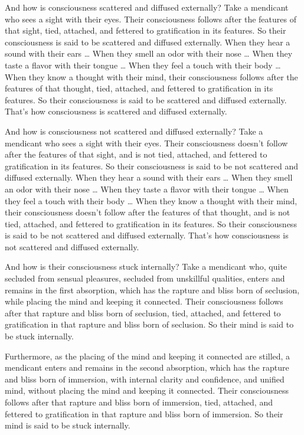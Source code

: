\documentclass[12pt,openany]{book}%
\begin{document}
And how is consciousness scattered and diffused externally? Take a mendicant who sees a sight with their eyes. Their consciousness follows after the features of that sight, tied, attached, and fettered to gratification in its features. So their consciousness is said to be scattered and diffused externally. When they hear a sound with their ears … When they smell an odor with their nose … When they taste a flavor with their tongue … When they feel a touch with their body … When they know a thought with their mind, their consciousness follows after the features of that thought, tied, attached, and fettered to gratification in its features. So their consciousness is said to be scattered and diffused externally. That’s how consciousness is scattered and diffused externally. 

And how is consciousness not scattered and diffused externally? Take a mendicant who sees a sight with their eyes. Their consciousness doesn’t follow after the features of that sight, and is not tied, attached, and fettered to gratification in its features. So their consciousness is said to be not scattered and diffused externally. When they hear a sound with their ears … When they smell an odor with their nose … When they taste a flavor with their tongue … When they feel a touch with their body … When they know a thought with their mind, their consciousness doesn’t follow after the features of that thought, and is not tied, attached, and fettered to gratification in its features. So their consciousness is said to be not scattered and diffused externally. That’s how consciousness is not scattered and diffused externally. 

And how is their consciousness stuck internally? Take a mendicant who, quite secluded from sensual pleasures, secluded from unskillful qualities, enters and remains in the first absorption, which has the rapture and bliss born of seclusion, while placing the mind and keeping it connected. Their consciousness follows after that rapture and bliss born of seclusion, tied, attached, and fettered to gratification in that rapture and bliss born of seclusion. So their mind is said to be stuck internally. 

Furthermore, as the placing of the mind and keeping it connected are stilled, a mendicant enters and remains in the second absorption, which has the rapture and bliss born of immersion, with internal clarity and confidence, and unified mind, without placing the mind and keeping it connected. Their consciousness follows after that rapture and bliss born of immersion, tied, attached, and fettered to gratification in that rapture and bliss born of immersion. So their mind is said to be stuck internally. 
\end{document}
